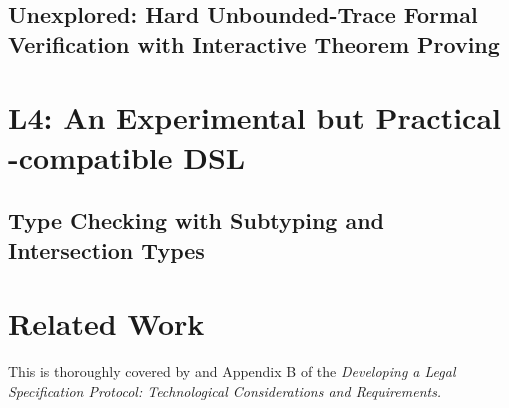 \documentclass[12pt]{article}
\newcommand{\term}[1]{\EM{\textsf{\hyperref[#1]{#1}}}\xspace}
\newcommand{\lsm}{\term{LSM}}
\begin{document}
\subsection{Unexplored: Hard Unbounded-Trace Formal Verification with Interactive Theorem Proving}

\section{L4: An Experimental but Practical \lsm-compatible DSL}

\subsection{Type Checking with Subtyping and Intersection Types} \label{typechecking}


\section{Related Work}

This is thoroughly covered by  and Appendix B of the  {\it Developing a Legal Specification Protocol: Technological Considerations and Requirements.}
\end{document}
